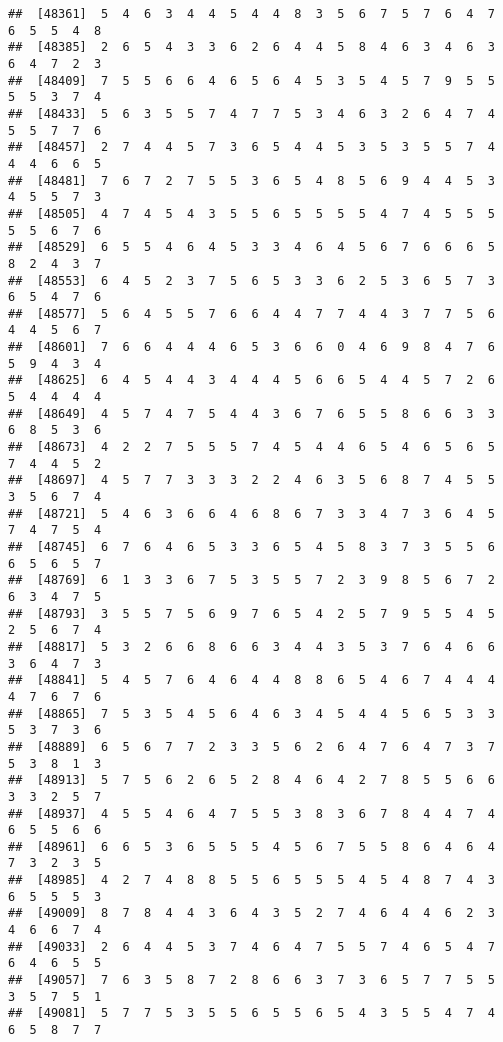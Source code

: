 \documentclass[
]{book}
\begin{document}
\begin{verbatim}
##  [48361]  5  4  6  3  4  4  5  4  4  8  3  5  6  7  5  7  6  4  7  6  5  5  4  8
##  [48385]  2  6  5  4  3  3  6  2  6  4  4  5  8  4  6  3  4  6  3  6  4  7  2  3
##  [48409]  7  5  5  6  6  4  6  5  6  4  5  3  5  4  5  7  9  5  5  5  5  3  7  4
##  [48433]  5  6  3  5  5  7  4  7  7  5  3  4  6  3  2  6  4  7  4  5  5  7  7  6
##  [48457]  2  7  4  4  5  7  3  6  5  4  4  5  3  5  3  5  5  7  4  4  4  6  6  5
##  [48481]  7  6  7  2  7  5  5  3  6  5  4  8  5  6  9  4  4  5  3  4  5  5  7  3
##  [48505]  4  7  4  5  4  3  5  5  6  5  5  5  5  4  7  4  5  5  5  5  5  6  7  6
##  [48529]  6  5  5  4  6  4  5  3  3  4  6  4  5  6  7  6  6  6  5  8  2  4  3  7
##  [48553]  6  4  5  2  3  7  5  6  5  3  3  6  2  5  3  6  5  7  3  6  5  4  7  6
##  [48577]  5  6  4  5  5  7  6  6  4  4  7  7  4  4  3  7  7  5  6  4  4  5  6  7
##  [48601]  7  6  6  4  4  4  6  5  3  6  6  0  4  6  9  8  4  7  6  5  9  4  3  4
##  [48625]  6  4  5  4  4  3  4  4  4  5  6  6  5  4  4  5  7  2  6  5  4  4  4  4
##  [48649]  4  5  7  4  7  5  4  4  3  6  7  6  5  5  8  6  6  3  3  6  8  5  3  6
##  [48673]  4  2  2  7  5  5  5  7  4  5  4  4  6  5  4  6  5  6  5  7  4  4  5  2
##  [48697]  4  5  7  7  3  3  3  2  2  4  6  3  5  6  8  7  4  5  5  3  5  6  7  4
##  [48721]  5  4  6  3  6  6  4  6  8  6  7  3  3  4  7  3  6  4  5  7  4  7  5  4
##  [48745]  6  7  6  4  6  5  3  3  6  5  4  5  8  3  7  3  5  5  6  6  5  6  5  7
##  [48769]  6  1  3  3  6  7  5  3  5  5  7  2  3  9  8  5  6  7  2  6  3  4  7  5
##  [48793]  3  5  5  7  5  6  9  7  6  5  4  2  5  7  9  5  5  4  5  2  5  6  7  4
##  [48817]  5  3  2  6  6  8  6  6  3  4  4  3  5  3  7  6  4  6  6  3  6  4  7  3
##  [48841]  5  4  5  7  6  4  6  4  4  8  8  6  5  4  6  7  4  4  4  4  7  6  7  6
##  [48865]  7  5  3  5  4  5  6  4  6  3  4  5  4  4  5  6  5  3  3  5  3  7  3  6
##  [48889]  6  5  6  7  7  2  3  3  5  6  2  6  4  7  6  4  7  3  7  5  3  8  1  3
##  [48913]  5  7  5  6  2  6  5  2  8  4  6  4  2  7  8  5  5  6  6  3  3  2  5  7
##  [48937]  4  5  5  4  6  4  7  5  5  3  8  3  6  7  8  4  4  7  4  6  5  5  6  6
##  [48961]  6  6  5  3  6  5  5  5  4  5  6  7  5  5  8  6  4  6  4  7  3  2  3  5
##  [48985]  4  2  7  4  8  8  5  5  6  5  5  5  4  5  4  8  7  4  3  6  5  5  5  3
##  [49009]  8  7  8  4  4  3  6  4  3  5  2  7  4  6  4  4  6  2  3  4  6  6  7  4
##  [49033]  2  6  4  4  5  3  7  4  6  4  7  5  5  7  4  6  5  4  7  6  4  6  5  5
##  [49057]  7  6  3  5  8  7  2  8  6  6  3  7  3  6  5  7  7  5  5  3  5  7  5  1
##  [49081]  5  7  7  5  3  5  5  6  5  5  6  5  4  3  5  5  4  7  4  6  5  8  7  7

\end{verbatim}
\end{document}
